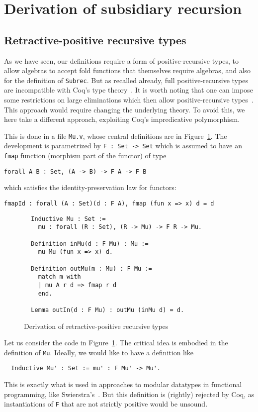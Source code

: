 \documentclass[a4paper,USenglish]{lipics-v2021}
\begin{document}
\section{Derivation of subsidiary recursion}
\label{sec:deriv}

\subsection{Retractive-positive recursive types}
\label{sec:mu}

As we have seen, our definitions require a form of positive-recursive
types, to allow algebras to accept fold functions that themselves
require algebras, and also for the definition of \verb|Subrec|.  But
as recalled already, full positive-recursive types are incompatible
with Coq's type theory~\cite{coquand88}.  It is worth noting that one
can impose some restrictions on large eliminations which then allow
positive-recursive types~\cite{blanqui05}.  This approach would
require changing the underlying theory.  To avoid this, we here take a
different approach, exploiting Coq's impredicative polymorphism.

This is done in a file \verb|Mu.v|, whose central definitions are in
Figure~\ref{fig:mu}.  The development is parametrized by
\verb|F : Set -> Set| which is assumed to have an \verb|fmap| function
(morphism part of the functor) of type
\begin{verbatim}
forall A B : Set, (A -> B) -> F A -> F B
\end{verbatim}
\noindent which satisfies the identity-preservation law for functors:
\begin{verbatim}
fmapId : forall (A : Set)(d : F A), fmap (fun x => x) d = d
\end{verbatim}

\begin{figure}
\begin{verbatim}
  Inductive Mu : Set := 
    mu : forall (R : Set), (R -> Mu) -> F R -> Mu.

  Definition inMu(d : F Mu) : Mu :=
    mu Mu (fun x => x) d.

  Definition outMu(m : Mu) : F Mu :=
    match m with
    | mu A r d => fmap r d
    end.

  Lemma outIn(d : F Mu) : outMu (inMu d) = d.
\end{verbatim}
\caption{Derivation of retractive-positive recursive types}
\label{fig:mu}
\end{figure}  

Let us consider the code in Figure~\ref{fig:mu}.  The critical
idea is embodied in the definition of \verb|Mu|.  Ideally, we would like
to have a definition like
\begin{verbatim}
  Inductive Mu' : Set := mu' : F Mu' -> Mu'.
\end{verbatim}
\noindent This is exactly what is used in approaches to modular
datatypes in functional programming, like
Swierstra's~\cite{swierstra08}.  But this definition is (rightly)
rejected by Coq, as instantiations of
\verb|F| that are not strictly positive would be unsound.
\end{document}
